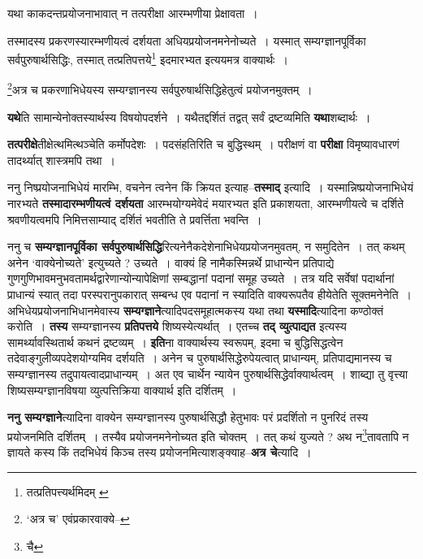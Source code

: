 \documentclass[article,12pt,a4paper]{memoir}
\begin{document}
	  \pstart यथा काकदन्तप्रयोजनाभावात् न तत्परीक्षा आरम्भणीया प्रेक्षावता ।
	\pend
       

	  \pstart तस्मादस्य प्रकरणस्यारम्भणीयत्वं दर्शयता अधियप्रयोजनमनेनोच्यते । यस्मात् सम्यग्ज्ञानपूर्विका सर्वपुरुषार्थसिद्धिः, तस्मात् तत्प्रतिपत्तये\footnote{तत्प्रतिपत्त्यर्थमिदम् \cite{dp-msA} \cite{dp-edE} \cite{dp-edN} \cite{dp-edH} \cite{dp-edP}} इदमारभ्यत इत्ययमत्र वाक्यार्थः ।
	\pend
       

	  \pstart \footnote{‘अत्र च’ एवंप्रकारवाक्ये--\cite{dp-msD-n}}अत्र च प्रकरणाभिधेयस्य सम्यग्ज्ञानस्य सर्वपुरुषार्थसिद्धिहेतुत्वं प्रयोजनमुक्तम् ।
	\pend
      

	  \pstart \textbf{यथे}ति सामान्येनोक्तस्यार्थस्य विषयोपदर्शने । यथैतद्दर्शितं तद्वत् सर्वं द्रष्टव्यमिति \textbf{यथा}शब्दार्थः ।
	\pend
      

	  \pstart \textbf{तत्परीक्षे}तीक्षेत्थमित्थञ्चेति कर्मोपदेशः । पदसंहतिरिति च बुद्धिस्थम् । परीक्षणं वा \textbf{परीक्षा} विमृष्यावधारणं तादर्थ्यात् शास्त्रमपि तथा ।
	\pend
      

	  \pstart ननु निष्प्रयोजनाभिधेयं मारम्भि, वचनेन त्वनेन किं क्रियत इत्याह--\textbf{तस्माद्} इत्यादि । यस्मान्निष्प्रयोजनाभिधेयं नारभ्यते \textbf{तस्मादारम्भणीयत्वं दर्शयता} आरम्भयोग्यमेवेदं मयारभ्यत इति प्रकाशयता, आरम्भणीयत्वे च दर्शिते श्रवणीयत्वमपि निमित्तसाम्याद् दर्शितं भवतीति ते प्रवर्त्तिता भवन्ति ।
	\pend
      

	  \pstart ननु च \textbf{सम्यग्ज्ञानपूर्विका सर्वपुरुषार्थसिद्धि}रित्यनेनैकदेशेनाभिधेयप्रयोजनमुवतम्, न समुदितेन । तत् कथम् अनेन ‘वाक्येनोच्यते’ इत्युच्यते ? उच्यते । वाक्यं हि नामैकस्मिन्नर्थे प्राधान्येन प्रतिपाद्ये गुणगुणिभावमनुभवतामर्थद्वारेणान्योन्यापेक्षिणां सम्बद्धानां पदानां समूह उच्यते । तत्र यदि सर्वेषां पदार्थानां प्राधान्यं स्यात् तदा परस्परानुपकारात् सम्बन्ध एव पदानां न स्यादिति वाक्यरूपतैव हीयेतेति सूक्तमनेनेति । अभिधेयप्रयोजनाभिधानमेवास्य \textbf{सम्यग्ज्ञाने}त्यादिपदसमूहात्मकस्य यथा तथा \textbf{यस्मादि}त्यादिना कण्ठोक्तं करोति । \textbf{तस्य} सम्यग्ज्ञानस्य \textbf{प्रतिपत्तये} शिष्यस्येत्यर्थात् । एतच्च \textbf{तद् व्युत्पाद्यत} इत्यस्य सामर्थ्यावस्थितार्थ कथनं द्रष्टव्यम् । \textbf{इति}ना वाक्यार्थस्य स्वरूपम्, इदमा च बुद्धिसिद्धत्वेन तदेवाङ्गुलीव्यपदेशयोग्यमिव दर्शयति । अनेन च पुरुषार्थसिद्धेरुपेयत्वात् प्राधान्यम्, प्रतिपाद्यमानस्य च सम्यग्ज्ञानस्य तदुपायत्वादप्राधान्यम् । अत एव चार्थेन न्यायेन पुरुषार्थसिद्धेर्वाक्यार्थत्वम् । शाब्द्या तु वृत्त्या शिष्यसम्यग्ज्ञानविषया व्युत्पत्तिक्रिया वाक्यार्थ इति दर्शितम् ।
	\pend
      

	  \pstart \textbf{ननु सम्यग्ज्ञाने}त्यादिना वाक्येन सम्यग्ज्ञानस्य पुरुषार्थसिद्धौ हेतुभावः परं प्रदर्शितो न पुनरिदं तस्य प्रयोजनमिति दर्शितम् । तस्यैव प्रयोजनमनेनोच्यत इति चोक्तम् । तत् कथं युज्यते ? अथ न\footnote{चै}तावतापि न ज्ञायते कस्य किं तदभिधेयं किञ्च तस्य प्रयोजनमित्याशङ्क्याह--\textbf{अत्र चे}त्यादि ।
	\pend
      
\end{document}
